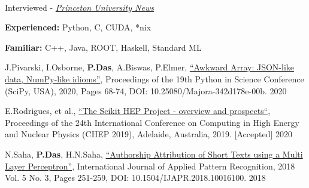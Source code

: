 \documentclass[10pt, letterpaper]{fulldeps}
\begin{document}
\vspace{-3pt}

%
%
\vspace{-5pt}
\\
\vspace{-15pt}
\begin{tightitemize}
\item Interviewed - \textit{\href{https://www.princeton.edu/news/2019/08/19/princeton-leads-efforts-develop-national-data-training-framework-high-energy}{Princeton University News}}
\end{tightitemize}
\vspace{-7pt}

%
%
\vspace{-5pt}
\textbf{Experienced:} Python, C, CUDA, *nix

\textbf{Familiar:} C++, Java, ROOT, Haskell,  Standard ML
\vspace{-6pt}

%
%
\small{\begin{tightitemize}
    \item J.Pivarski, I.Osborne, {\textbf{P.Das}}, A.Biswas, P.Elmer, {\href{http://conference.scipy.org/proceedings/scipy2020/jim_pivarski.html}{``Awkward Array: JSON-like data, NumPy-like idioms''}}, Proceedings of the 19th Python in Science Conference (SciPy, USA), 2020, Pages 68-74, DOI: 10.25080/Majora-342d178e-00b. \hfill{2020}
    \item E.Rodrigues, et al., {\href{https://arxiv.org/abs/2007.03577}{``The Scikit HEP Project - overview and prospects``}}, Proceedings of the 24th International Conference on Computing in High Energy and Nuclear Physics (CHEP 2019), Adelaide, Australia, 2019. [Accepted] \hfill{2020}
    \item N.Saha, {\textbf{P.Das}}, H.N.Saha, {\href{https://www.inderscienceonline.com/doi/abs/10.1504/IJAPR.2018.094819}{``Authorship Attribution of Short Texts using a Multi Layer Perceptron''}}, International Journal of Applied Pattern Recognition, 2018 Vol. 5 No. 3, Pages 251-259, DOI: 10.1504/IJAPR.2018.10016100. \hfill{2018}
\end{tightitemize}}
\end{document}
